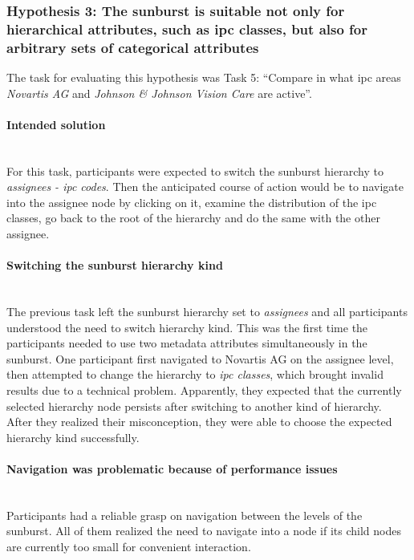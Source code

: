 \subsubsection{Hypothesis 3: The sunburst is suitable not only for hierarchical attributes, such as \gls{ipc} classes, but also for arbitrary sets of categorical attributes}
\label{subsubsec:hypothesis3}

The task for evaluating this hypothesis was Task 5: ``Compare in what \gls{ipc} areas \textit{Novartis AG} and \textit{Johnson \& Johnson Vision Care} are active''.

\paragraph{Intended solution}~\\
For this task, participants were expected to switch the sunburst hierarchy to \textit{assignees - \gls{ipc} codes}.
Then the anticipated course of action would be to navigate into the assignee node by clicking on it, examine the distribution of the \gls{ipc} classes, go back to the root of the hierarchy and do the same with the other assignee.

\paragraph{Switching the sunburst hierarchy kind}~\\
The previous task left the sunburst hierarchy set to \textit{assignees} and all participants understood the need to switch hierarchy kind.
This was the first time the participants needed to use two metadata attributes simultaneously in the sunburst.
One participant first navigated to Novartis AG on the assignee level, then attempted to change the hierarchy to \textit{\gls{ipc} classes}, which brought invalid results due to a technical problem.
Apparently, they expected that the currently selected hierarchy node persists after switching to another kind of hierarchy.
After they realized their misconception, they were able to choose the expected hierarchy kind successfully.

\paragraph{Navigation was problematic because of performance issues}~\\
Participants had a reliable grasp on navigation between the levels of the sunburst.
All of them realized the need to navigate into a node if its child nodes are currently too small for convenient interaction.

